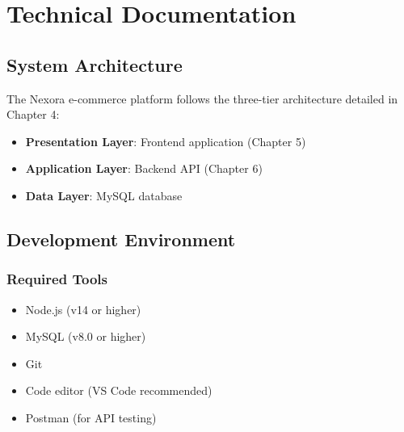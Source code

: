 
\chapter{Technical Documentation}

\section{System Architecture}
The Nexora e-commerce platform follows the three-tier architecture detailed in Chapter 4:
\begin{itemize}
    \item \textbf{Presentation Layer}: Frontend application (Chapter 5)
    \item \textbf{Application Layer}: Backend API (Chapter 6)
    \item \textbf{Data Layer}: MySQL database
\end{itemize}



\section{Development Environment}
\subsection{Required Tools}
\begin{itemize}
    \item Node.js (v14 or higher)
    \item MySQL (v8.0 or higher)
    \item Git
    \item Code editor (VS Code recommended)
    \item Postman (for API testing)
\end{itemize}

